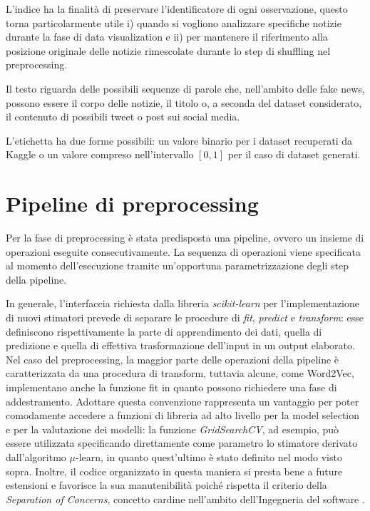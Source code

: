 \documentclass[12pt]{report}
\theoremstyle{definition}
\begin{document}
L'indice ha la finalità di preservare l'identificatore di ogni osservazione, questo torna particolarmente utile i) quando si vogliono analizzare specifiche notizie durante la fase di data visualization e ii) per mantenere il riferimento alla posizione originale delle notizie rimescolate durante lo step di shuffling nel preprocessing.

Il testo riguarda delle possibili sequenze di parole che, nell'ambito delle fake news, possono essere il corpo delle notizie, il titolo o, a seconda del dataset considerato, il contenuto di possibili tweet o post sui social media.

L'etichetta ha due forme possibili: un valore binario per i dataset recuperati da Kaggle o un valore compreso nell'intervallo $[0,1]$ per il caso di dataset generati.

\section{Pipeline di preprocessing}\label{pp}
Per la fase di preprocessing è stata predisposta una pipeline, ovvero un insieme di operazioni eseguite consecutivamente.
La sequenza di operazioni viene specificata al momento dell'esecuzione tramite un'opportuna parametrizzazione degli step della pipeline.

In generale, l'interfaccia richiesta dalla libreria \textit{scikit-learn} per l'implementazione di nuovi stimatori prevede di separare le procedure di \textit{fit}, \textit{predict} e \textit{transform}: esse definiscono rispettivamente la parte di apprendimento dei dati, quella di predizione e quella di effettiva trasformazione dell'input in un output elaborato. Nel caso del preprocessing, la maggior parte delle operazioni della pipeline è caratterizzata da una procedura di transform, tuttavia alcune, come Word2Vec, implementano anche la funzione fit in quanto possono richiedere una fase di addestramento.
Adottare questa convenzione rappresenta un vantaggio per poter comodamente accedere a funzioni di libreria ad alto livello per la model selection e per la valutazione dei modelli: la funzione \textit{GridSearchCV}, ad esempio, può essere utilizzata specificando direttamente come parametro lo stimatore derivato dall'algoritmo $\mu$-learn, in quanto quest'ultimo è stato definito nel modo visto sopra.
Inoltre, il codice organizzato in questa maniera si presta bene a future estensioni e favorisce la sua manutenibilità poiché rispetta il criterio della \textit{Separation of Concerns}, concetto cardine nell'ambito dell'Ingegneria del software \cite{32}.
\end{document}

